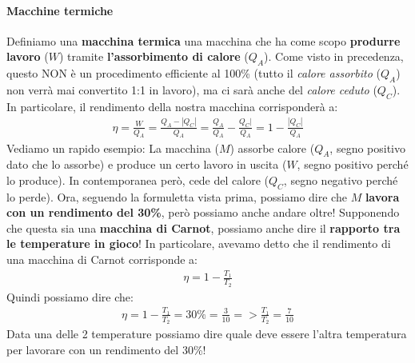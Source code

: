                 \paragraph{Macchine termiche}
                    Definiamo una \textbf{macchina termica} una macchina che ha come scopo \textbf{produrre lavoro} ($W$) tramite \textbf{l'assorbimento di calore} ($Q_A$). Come visto in precedenza, questo NON è un procedimento efficiente al 100\% (tutto il \textit{calore assorbito} ($Q_A$) non verrà mai convertito 1:1 in lavoro), ma ci sarà anche del \textit{calore ceduto} ($Q_C$). In particolare, il rendimento della nostra macchina corrisponderà a:
                    \begin{align*}
                        \eta = \frac{W}{Q_A} = \frac{Q_A-|Q_C|}{Q_A} =  \frac{Q_A}{Q_A}- \frac{Q_C|}{Q_A} = 1- \frac{|Q_C|}{Q_A}
                    \end{align*}
                    Vediamo un rapido esempio:
                    La macchina ($M$) assorbe calore ($Q_A$, segno positivo dato che lo assorbe) e produce un certo lavoro in uscita ($W$, segno positivo perché lo produce). In contemporanea però, cede del calore ($Q_C$, segno negativo perché lo perde). Ora, seguendo la formuletta vista prima, possiamo dire che $M$ \textbf{lavora con un rendimento del 30\%}, però possiamo anche andare oltre! Supponendo che questa sia una \textbf{macchina di Carnot}, possiamo anche dire il \textbf{rapporto tra le temperature in gioco}! In particolare, avevamo detto che il rendimento di una macchina di Carnot corrisponde a:
                    \begin{align*}
                        \eta=1-\frac{T_1}{T_2}
                    \end{align*}
                    Quindi possiamo dire che:
                    \begin{align*}
                        \eta=1-\frac{T_1}{T_2}=30\%=\frac{3}{10} => \frac{T_1}{T_2}= \frac{7}{10}
                    \end{align*}
                    Data una delle 2 temperature possiamo dire quale deve essere l'altra temperatura per lavorare con un rendimento del 30\%!


